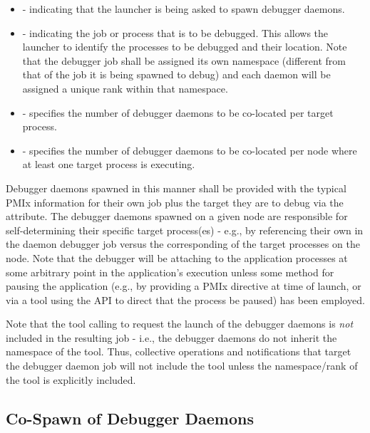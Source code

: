 {\begin{itemize}
    \item {} - indicating that the launcher is
    being asked to spawn debugger daemons.
    \item {} - indicating the job or process that is
    to be debugged. This allows the launcher to identify the processes to be
    debugged and their location. Note that the debugger job shall be assigned
    its own namespace (different from that of the job it is being spawned
    to debug) and each daemon will be assigned a unique rank within that
    namespace.
    \item {} - specifies the number of
    debugger daemons to be co-located per target process.
    \item {} - specifies the number of
    debugger daemons to be co-located per node where at least one target
    process is executing.
\end{itemize}

Debugger daemons spawned in this manner shall be provided with the typical
\ac{PMIx} information for their own job plus the target they are to debug via
the  attribute. The debugger daemons spawned on a
given node are responsible for self-determining their specific target
process(es) - e.g., by referencing their own  in the
daemon debugger job versus the corresponding  of the
target processes on the node. Note that the debugger will be attaching to the application processes
at some arbitrary point in the application's execution unless some method for pausing the application
(e.g., by providing a \ac{PMIx} directive at time of launch, or via a tool using the
 \ac{API} to direct that the process be paused) has been employed.

\adviceuserstart
Note that the tool calling  to request the launch of the debugger daemons is \emph{not} included in the resulting job - i.e., the debugger daemons do not inherit the namespace of the tool. Thus, collective operations and notifications that target the debugger daemon job will not include the tool unless the namespace/rank of the tool is explicitly included.
\adviceuserend

\subsection{Co-Spawn of Debugger Daemons}
\label{chap:api_tools:cospawn}

}
